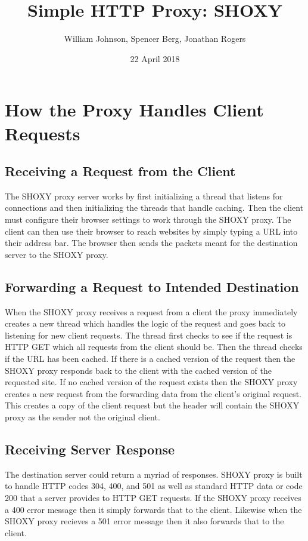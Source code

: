 \documentclass[11pt]{article}
\title{Simple HTTP Proxy: SHOXY}
\author{William Johnson, Spencer Berg,  Jonathan Rogers}
\date{22 April 2018}
\begin{document}
\maketitle

\thispagestyle{empty}

\begin{doublespace}



\end{doublespace}

\section{How the Proxy Handles Client Requests}
\subsection{Receiving a Request from the Client}
The SHOXY proxy server works by first initializing a thread that listens for connections and then initializing the threads that handle caching. Then the client must configure their browser settings to work through the SHOXY proxy. The client can then use their browser to reach websites by simply typing a URL into their address bar. The browser then sends the packets meant for the destination server to the SHOXY proxy. 

\subsection{Forwarding a Request to Intended Destination}
When the SHOXY proxy receives a request from a client the proxy immediately creates a new thread which handles the logic of the request and goes back to listening for new client requests. The thread first checks to see if the request is HTTP GET which all requests from the client should be. Then the thread checks if the URL has been cached. If there is a cached version of the request then the SHOXY proxy responds back to the client with the cached version of the requested site. If no cached version of the request exists then the SHOXY proxy creates a new request from the forwarding data from the client's original request. This creates a copy of the client request but the header will contain the SHOXY proxy as the sender not the original client. 

\subsection{Receiving Server Response}
The destination server could return a myriad of responses. SHOXY proxy is built to handle HTTP codes 304, 400, and 501 as well as standard HTTP data or code 200 that a server provides to HTTP GET requests. If the SHOXY proxy receives a 400 error message then it simply forwards that to the client. Likewise when the SHOXY proxy recieves a 501 error message then it also forwards that to the client. 
\end{document}

